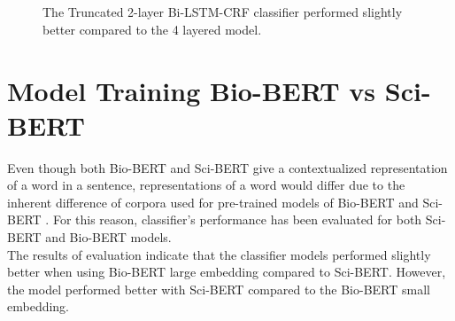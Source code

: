 \begin{figure}[h]
	
	\myfloatalign
	
	 \\
	\\
	\caption{The Truncated 2-layer \ac{Bi-LSTM-CRF} classifier performed slightly better compared to the 4 layered model.}
\end{figure}


\section{Model Training Bio-BERT vs Sci-BERT}
\label{sec:chapter06:biosci}

Even though both \ac{Bio-BERT} and \ac{Sci-BERT} give a contextualized representation of a word in a sentence, representations of a word would differ due to the inherent difference of corpora used for pre-trained models of Bio-BERT and Sci-BERT \citep{beltagy2019scibert,li2019fine}. For this reason, classifier’s performance has been evaluated for both Sci-BERT and Bio-BERT models. \\

The results of evaluation indicate that the classifier models performed slightly better when using Bio-BERT large embedding compared to Sci-BERT. However, the model performed better with Sci-BERT compared to the Bio-BERT small embedding. 

